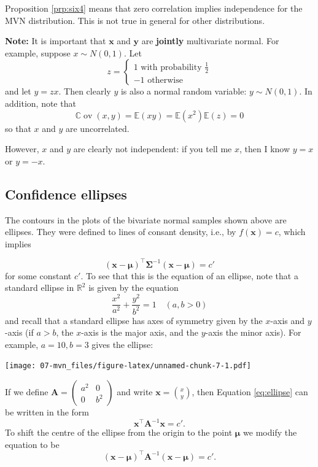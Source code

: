 \documentclass[
]{book}
\theoremstyle{definition}
\theoremstyle{definition}
\theoremstyle{definition}
\theoremstyle{definition}
\theoremstyle{remark}
\begin{document}
Proposition \ref{prp:six4} means that zero correlation implies independence for the MVN distribution. This is not true in general for other distributions.

\textbf{Note:} It is important that \(\mathbf x\) and \(\mathbf y\) are \textbf{jointly} multivariate normal. For example, suppose \(x \sim N(0, 1)\). Let
\[z=\begin{cases}
1 \mbox{ with probability } \frac{1}{2}\\
-1 \mbox{ otherwise}
\end{cases}
\]
and let \(y=zx\). Then clearly \(y\) is also a normal random variable: \(y \sim N(0,1)\). In addition, note that
\[{\mathbb{C}\operatorname{ov}}(x,y)= {\mathbb{E}}(xy)= {\mathbb{E}}(x^2){\mathbb{E}}(z)=0\]
so that \(x\) and \(y\) are uncorrelated.

However, \(x\) and \(y\) are clearly not independent: if you tell me \(x\), then I know \(y=x\) or \(y=-x\).

\hypertarget{confidence-ellipses}{%
\subsection{Confidence ellipses}\label{confidence-ellipses}}

The contours in the plots of the bivariate normal samples shown above are ellipses.
They were defined to lines of consant density, i.e., by \(f(\mathbf x)=c\), which implies

\begin{equation}
(\mathbf x- {\boldsymbol{\mu}})^\top \boldsymbol{\Sigma}^{-1} (\mathbf x- {\boldsymbol{\mu}})=c' \label{eq:mvnellipse}
\end{equation}
for some constant \(c'\).
To see that this is the equation of an ellipse, note that a standard ellipse in \(\mathbb{R}^2\) is given by the equation
\begin{equation}
\frac{x^2}{a^2}+\frac{y^2}{b^2}=1 \quad (a, b>0) \label{eq:ellipse}
\end{equation}
and recall that a standard ellipse has axes of symmetry given by the \(x\)-axis and \(y\)-axis
(if \(a>b\), the \(x\)-axis is the major axis, and the \(y\)-axis the minor axis). For example, \(a=10, b=3\) gives the ellipse:

\texttt{[image: 07-mvn\_files/figure-latex/unnamed-chunk-7-1.pdf]}

If we define
\({\mathbf A}=\left( \begin{array}{cc} a^2&0\\ 0&b^2 \end{array} \right)\) and write \({\mathbf x}=\binom{x}{y}\),
then Equation \eqref{eq:ellipse} can be written in the form
\[ \mathbf x^\top {\mathbf A}^{-1}\mathbf x=c'. \]
To shift the centre of the ellipse from the origin to the point \({\boldsymbol{\mu}}\) we modify the equation to be
\[ (\mathbf x-{\boldsymbol{\mu}})^\top {\mathbf A}^{-1}(\mathbf x-{\boldsymbol{\mu}}) =c'.\]
\end{document}
